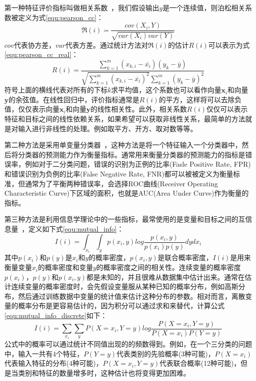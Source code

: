 第一种特征评价指标叫做相关系数~\cite{Weston2003Use}，我们假设输出$y$是一个连续值，则泊松相关系数被定义为式\ref{equ:pearson_cc}：
\begin{equation}
\label{equ:pearson_cc}
    \Re(i) = \frac{cov(X_i, Y)}{\sqrt{var(X_i)var(Y)}}
\end{equation}
$cov$代表协方差，$var$代表方差。通过统计方法对$\Re(i)$的估计$R(i)$可以表示为式\ref{equ:pearson_cc_real}：
\begin{equation}
\label{equ:pearson_cc_real}
    R(i) = \frac{\sum_{k=1}^{m}(x_{k,i} - \overline{x_i})(y_k - \overline{y})}{\sqrt{\sum_{k=1}^{m}(x_{k,i} - \overline{x_i})^2}\sum_{k=1}^{m}(y_k - \overline{y})^2}
\end{equation}
符号上面的横线代表对所有的下标$k$求平均值，这个系数也可以看作向量$\mathbf{x}_i$和向量$\mathbf{y}$的余弦值。在线性回归中，评价指标通常是$R(i)$的平方，这样将可以去除负值，仅仅表示向量$\mathbf{x}_i$和向量$\mathbf{y}$的线性相关性。此外，相关系数$R(i)$仅仅可以表示特征和目标之间的线性依赖关系，如果希望可以获取非线性关系，最简单的方法就是对输入进行非线性的处理。例如取平方、开方、取对数等等。

第二种方法是采用单变量分类器~\cite{Forman2003An}，这种方法是将一个特征输入一个分类器中，然后将分类器的预测能力作为衡量指标。通常用来衡量分类器的预测能力的指标是错误率，例如对于二分类问题，错误的识别为正例的比率(Fasle Positive Rate, FPR)和错误识别为负例的比率(False Negative Rate, FNR)都可以被被定义为衡量标准，但通常为了平衡两种错误率，会选择ROC曲线(Receiver Operating Characteristic Curve)下区域的面积，也就是AUC(Area Under Curve)作为衡量的指标。

第三种方法是利用信息学理论中的一些指标，最常使用的是变量和目标之间的互信息量~\cite{Forman2003An, Bekkerman2003Distributional}，定义如下式\ref{equ:mutual_info}：
\begin{equation}
\label{equ:mutual_info}
    I(i) = \int_{x_i}\int_{y}p(x_i, y)log\frac{p(x_i, y)}{p(x_i)p(y)}dydx_i
\end{equation}
其中$p(x_i)$和$p(y)$是$x_i$和$y$的概率密度，$p(x_i, y)$是联合概率密度，$I(i)$是用来衡量变量$x_i$的概率密度和变量$y$的概率密度之间的相关性。连续变量的概率密度$p(x_i)$，$p(y)$和$p(x_i, y)$都是未知的，并且很难从数据集中估计出来。通常在估计连续变量的概率密度时，会先假设变量服从某种已知的概率分布，例如高斯分布，然后通过训练数据中变量的统计值来估计这种分布的参数。相对而言，离散变量的概率分布是更容易估计的，因为积分可以通过求和来替代，计算公式\ref{equ:mutual_info_discrete}如下：
\begin{equation}
\label{equ:mutual_info_discrete}
    I(i) = \sum_{x_i}\sum_{y}P(X=x_i, Y=y)log\frac{P(X=x_i, Y=y)}{P(X=x_i)P(Y=y)}
\end{equation}
公式中的概率可以通过统计不同值出现的的频数得到。例如，在一个三分类的问题中，输入一共有4个特征，$P(Y=y)$代表类别的先验概率(3种可能)，$P(X=x_i)$代表输入特征的分布(4种可能)，$P(X=x_i, Y=y)$代表联合概率(12种可能)，但是当类别和特征的数量增多时，这种估计也将变得更加困难。

